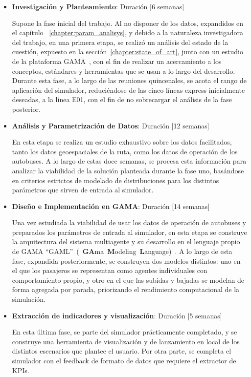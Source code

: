 \begin{itemize}

\item \textbf{Investigación y Planteamiento}: Duración [6 semanas]

Supone la fase inicial del trabajo. Al no disponer de los datos, expandidos en el capítulo
~\ref{chapter:param_analisys}, y debido a la naturaleza investigadora del trabajo, en una primera 
etapa, se realizó un análisis del estado de la cuestión, expuesto en la 
sección~\ref{chapter:state_of_art}, junto con un estudio de la plataforma 
GAMA~\cite{taillandier2019gama}, con el fin de realizar un acercamiento a los conceptos, 
estándares y herramientas que se usan a lo largo del desarrollo. Durante esta fase, a lo 
largo de las reuniones quincenales, se acota el rango de aplicación del simulador, reduciéndose 
de las cinco líneas express inicialmente deseadas, a la línea E01, con el fin de no sobrecargar el 
análisis de la fase posterior.

\item \textbf{Análisis y Parametrización de Datos}: Duración [12 semanas]

En esta etapa se realiza un estudio exhaustivo sobre los datos facilitados, tanto los datos 
geoespaciales de la ruta, como los datos de operación de los autobuses. A lo largo de estas doce 
semanas, se procesa esta información para analizar la viabilidad de la solución planteada durante la 
fase uno, basándose en criterios estrictos de modelado de distribuciones para los distintos parámetros 
que sirven de entrada al simulador.

\item \textbf{Diseño e Implementación en GAMA}: Duración [14 semanas]

Una vez estudiada la viabilidad de usar los datos de operación de autobuses y preparados los 
parámetros de entrada al simulador, en esta etapa se construye la arquitectura del sistema 
multiagente y su desarrollo en el lenguaje propio de GAMA \enquote{GAML}~(~\textbf{GA}ma~\textbf{M}odeling~\textbf{L}anguage)~\cite{taillandier2019gama}. 
A lo largo de esta fase, expandida posteriormente, 
se construyen dos modelos distintos: uno en el que los pasajeros se representan como agentes 
individuales con comportamiento propio, y otro en el que las subidas y bajadas se modelan de 
forma agregada por parada, priorizando el rendimiento computacional de la simulación.

\item  \textbf{Extracción de indicadores y visualización}: Duración [5 semanas]

En esta última fase, se parte del simulador prácticamente completado, y se construye una 
herramienta de visualización y de lanzamiento en local de los distintos escenarios que plantee 
el usuario. Por otra parte, se completa el simulador con el feedback de formato de datos que 
requiere el extractor de KPIs.


\end{itemize}

